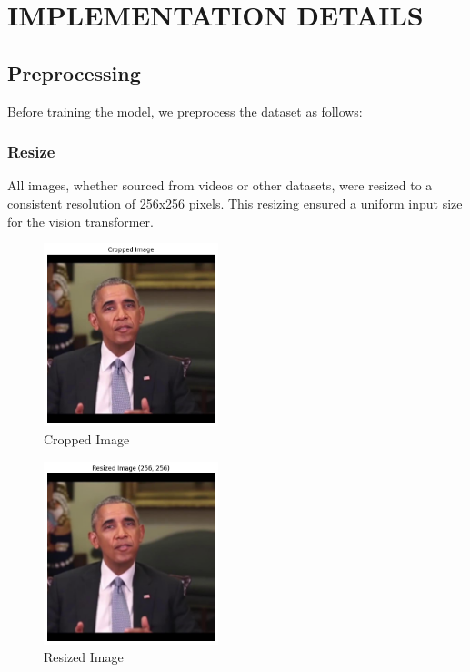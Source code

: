 \section{IMPLEMENTATION DETAILS}
\subsection{Preprocessing}

Before training the model, we preprocess the dataset as follows:

\subsubsection{Resize}
All images, whether sourced from videos or other datasets, were resized to a consistent resolution of 256x256 pixels. This resizing ensured a uniform input size for the vision transformer.

\begin{figure}[ht]
    \centering
    \includegraphics[width=2in]{img/cropped.png}
    \caption{Cropped Image}
    \label{fig:cropped}
\end{figure}

\begin{figure}[ht]
    \centering
    \includegraphics[width=2in]{img/resized.png}
    \caption{Resized Image}
    \label{fig:resized}
\end{figure}

